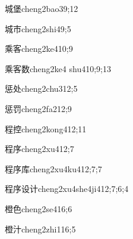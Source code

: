 \begin{verbete}{城堡}{cheng2bao3}{9;12}
\end{verbete}

\begin{verbete}{城市}{cheng2shi4}{9;5}
\end{verbete}

\begin{verbete}{乘客}{cheng2ke4}{10;9}
\end{verbete}

\begin{verbete}{乘客数}{cheng2ke4 shu4}{10;9;13}
\end{verbete}

\begin{verbete}{惩处}{cheng2chu3}{12;5}
\end{verbete}

\begin{verbete}{惩罚}{cheng2fa2}{12;9}
\end{verbete}

\begin{verbete}{程控}{cheng2kong4}{12;11}
\end{verbete}

\begin{verbete}{程序}{cheng2xu4}{12;7}
\end{verbete}

\begin{verbete}{程序库}{cheng2xu4ku4}{12;7;7}
\end{verbete}

\begin{verbete}{程序设计}{cheng2xu4she4ji4}{12;7;6;4}
\end{verbete}

\begin{verbete}{橙色}{cheng2se4}{16;6}
\end{verbete}

\begin{verbete}{橙汁}{cheng2zhi1}{16;5}
\end{verbete}

